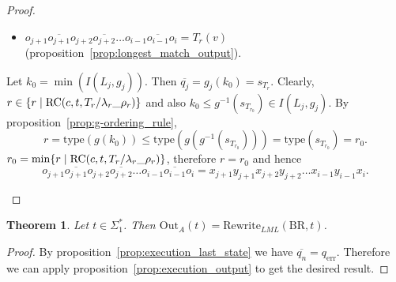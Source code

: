 \documentclass{article}
\newtheorem{theorem}[definition]{Theorem}
\begin{document}
\begin{proof}
\begin{description}
\begin{description}
\begin{itemize}
							\item \( o_{j+1}\overline{o_{j+1}}o_{j+2}\overline{o_{j+2}}\ldots o_{i-1}\overline{o_{i-1}}o_{i} = T_r(v) \) (proposition~\ref{prop:longest_match_output}).
						\end{itemize}
						Let $k_0 = \min(I(L_j, g_j))$.
						Then $\overline{q_j} = g_j(k_0) = s_{T_r}$.
						Clearly, $r\in \{r \mid \mathrm{RC}(c, t, \crr[T_r][\lambda_r][\rho_r]) \}$ and also $k_0 \le g^{-1}(s_{T_{r_0}})\in I(L_j, g_j)$. By proposition~\ref{prop:g-ordering_rule},
						\[ r = \mathrm{type}(g(k_0))\le \mathrm{type}(g(g^{-1}(s_{T_{r_0}}))) = \mathrm{type}(s_{T_{r_0}}) = r_0. \]
						$r_0 = \min\{r \mid \mathrm{RC}(c, t, \crr[T_r][\lambda_r][\rho_r]) \}$, therefore $r = r_0$ and hence
						\[ o_{j+1}\overline{o_{j+1}}o_{j+2}\overline{o_{j+2}}\ldots o_{i-1}\overline{o_{i-1}}o_{i} =
							x_{j+1}y_{j+1}x_{j+2}y_{j+2}\ldots x_{i-1}y_{i-1}x_i. \]
				\end{description}
		\end{description}
	\end{proof}

	\begin{theorem} \label{thm:two-step_bimachine_output}
		Let $t\in \Sigma_1^*$.
		Then $\mathrm{Out}_A(t) = \mathrm{Rewrite}_{LML}(\mathrm{BR}, t)$.
	\end{theorem}
	\begin{proof}
		By proposition~\ref{prop:execution_last_state} we have $\overline{q_n} = q_\mathrm{err}$. Therefore we can apply proposition~\ref{prop:execution_output} to get the desired result.
	\end{proof}
\end{document}
